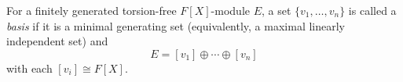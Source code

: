 For a finitely generated torsion-free $F[X]$-module $E$, a set $\{v_1, \ldots, v_n\}$ is called a \emph{basis} if it is a minimal generating set (equivalently, a maximal linearly independent set) and
$$E = [v_1] \oplus \cdots \oplus [v_n]$$
with each $[v_i] \cong F[X]$.
